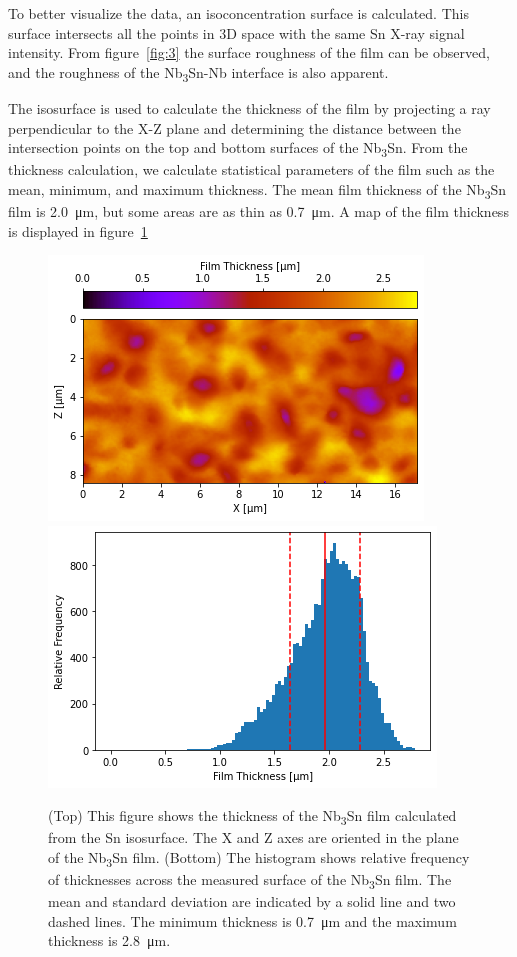 To better visualize the data, an isoconcentration surface is calculated. This surface intersects all the points in 3D space with the same Sn X-ray signal intensity. From figure~\ref{fig:3} the surface roughness of the film can be observed, and the roughness of the Nb\textsubscript{3}Sn-Nb interface is also apparent.
 
The isosurface is used to calculate the thickness of the film by projecting a ray perpendicular to the X-Z plane and determining the distance between the intersection points on the top and bottom surfaces of the Nb\textsubscript{3}Sn. From the thickness calculation, we calculate statistical parameters of the film such as the mean, minimum, and maximum thickness. The mean film thickness of the Nb\textsubscript{3}Sn film is \qty{2.0}{\micro\meter}, but some areas are as thin as \qty{0.7}{\micro\meter}. A map of the film thickness is displayed in figure~\ref{fig:4}

\begin{figure}[htb]%
    \centering%
    \includegraphics[width=0.5\columnwidth]{../figs/Figure-4a.png}%
    \includegraphics[width=0.5\columnwidth]{../figs/Figure-4b.png}%
    \caption{(Top) This figure shows the thickness of the Nb\textsubscript{3}Sn film calculated from the Sn isosurface.  The X and Z axes are oriented in the plane of the Nb\textsubscript{3}Sn film. (Bottom) The histogram shows relative frequency of thicknesses across the measured surface of the Nb\textsubscript{3}Sn film. The mean and standard deviation are indicated by a solid line and two dashed lines. The minimum thickness is \qty{0.7}{\micro\meter} and the maximum thickness is \qty{2.8}{\micro\meter}.}%
    \label{fig:4}%
\end{figure}
 
